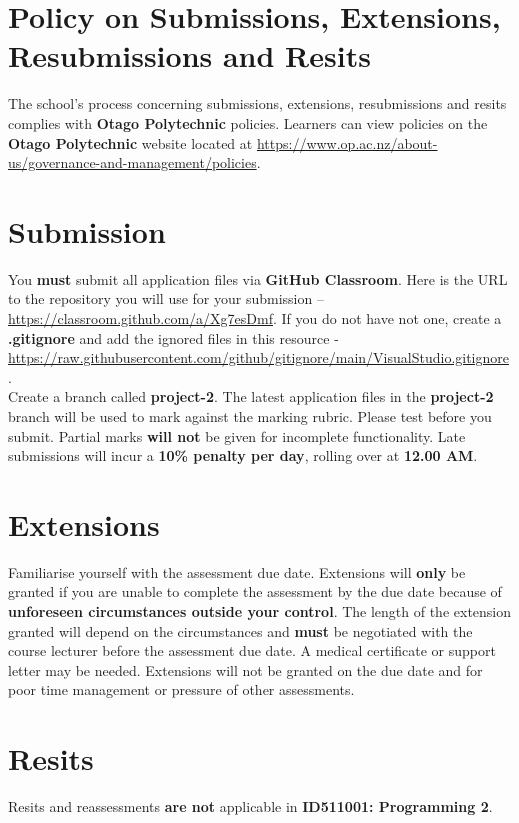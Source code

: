 \documentclass{article}
\begin{document}
\section*{Policy on Submissions, Extensions, Resubmissions and Resits}
The school's process concerning submissions, extensions, resubmissions and resits complies with \textbf{Otago Polytechnic} policies. Learners can view policies on the \textbf{Otago Polytechnic} website located at \href{https://www.op.ac.nz/about-us/governance-and-management/policies}{https://www.op.ac.nz/about-us/governance-and-management/policies}.

\section*{Submission}
You \textbf{must} submit all application files via \textbf{GitHub Classroom}. Here is the URL to the repository you will use for your submission – \href{https://classroom.github.com/a/Xg7esDmf}{https://classroom.github.com/a/Xg7esDmf}. If you do not have not one, create a \textbf{.gitignore} and add the ignored files in this resource - \href{https://raw.githubusercontent.com/github/gitignore/main/VisualStudio.gitignore}{https://raw.githubusercontent.com/github/gitignore/main/VisualStudio.gitignore}. \\

Create a branch called \textbf{project-2}. The latest application files in the \textbf{project-2} branch will be used to mark against the marking rubric. Please test before you submit. Partial marks \textbf{will not} be given for incomplete functionality. Late submissions will incur a \textbf{10\% penalty per day}, rolling over at \textbf{12.00 AM}.

\section*{Extensions}
Familiarise yourself with the assessment due date. Extensions will \textbf{only} be granted if you are unable to complete the assessment by the due date because of \textbf{unforeseen circumstances outside your control}. The length of the extension granted will depend on the circumstances and \textbf{must} be negotiated with the course lecturer before the assessment due date. A medical certificate or support letter may be needed. Extensions will not be granted on the due date and for poor time management or pressure of other assessments.

\section*{Resits}
Resits and reassessments \textbf{are not} applicable in \textbf{ID511001: Programming 2}.
\end{document}
